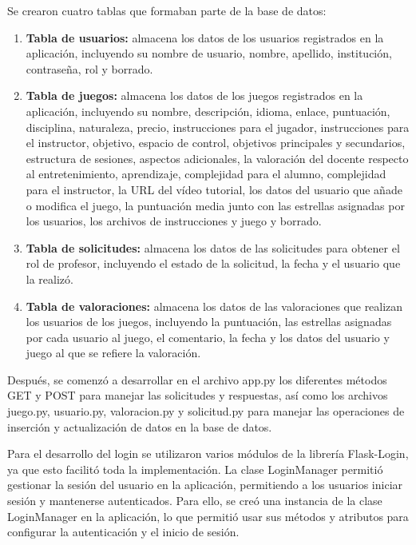 Se crearon cuatro tablas que formaban parte de la base de datos: 
\begin{enumerate}
    \item \textbf{Tabla de usuarios:} almacena los datos de los usuarios registrados en la aplicación, incluyendo su nombre de usuario, nombre, apellido, institución, contraseña, rol y borrado.
    \item \textbf{Tabla de juegos:} almacena los datos de los juegos registrados en la aplicación, incluyendo su nombre, descripción, idioma, enlace, puntuación, disciplina, naturaleza, precio, instrucciones para el jugador, instrucciones para el instructor, objetivo, espacio de control, objetivos principales y secundarios, estructura de sesiones, aspectos adicionales, la valoración del docente respecto al entretenimiento, aprendizaje, complejidad para el alumno, complejidad para el instructor, la URL del vídeo tutorial, los datos del usuario que añade o modifica el juego, la puntuación media junto con las estrellas asignadas por los usuarios, los archivos de instrucciones y juego y borrado.
    \item \textbf{Tabla de solicitudes:} almacena los datos de las solicitudes para obtener el rol de profesor, incluyendo el estado de la solicitud, la fecha y el usuario que la realizó.
    \item \textbf{Tabla de valoraciones:} almacena los datos de las valoraciones que realizan los usuarios de los juegos, incluyendo la puntuación, las estrellas asignadas por cada usuario al juego, el comentario, la fecha y los datos del usuario y juego al que se refiere la valoración.
\end{enumerate}

Después, se comenzó a desarrollar en el archivo app.py los diferentes métodos GET y POST para manejar las solicitudes y respuestas, así como los archivos juego.py, usuario.py, valoracion.py y solicitud.py para manejar las operaciones de inserción y actualización de datos en la base de datos.

Para el desarrollo del login se utilizaron varios módulos de la librería Flask-Login, ya que esto facilitó toda la implementación. La clase LoginManager permitió gestionar la sesión del usuario en la aplicación, permitiendo a los usuarios iniciar sesión y mantenerse autenticados. Para ello, se creó una instancia de la clase LoginManager en la aplicación, lo que permitió usar sus métodos y atributos para configurar la autenticación y el inicio de sesión.

